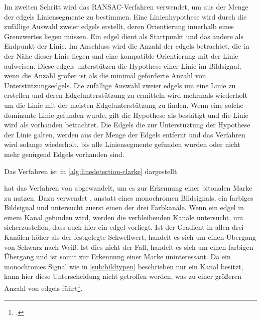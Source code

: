 Im zweiten Schritt wird das RANSAC-Verfahren verwendet, um aus der Menge der \glspl{edgel} Liniensegmente zu bestimmen.
 Eine Linienhypothese wird durch die zufällige Auswahl zweier \glspl{edgel} erstellt, deren Orientierung innerhalb
 eines Grenzwertes liegen müssen. Ein \gls{edgel} dient als Startpunkt und das andere als Endpunkt der Linie. Im
 Anschluss wird die Anzahl der \glspl{edgel} betrachtet, die in der Nähe dieser Linie liegen und eine kompatible
 Orientierung mit der Linie aufweisen. Diese \glspl{edgel} unterstützen die Hypothese einer Linie im Bildsignal, wenn
 die Anzahl größer ist als die minimal geforderte Anzahl von Unterstützungsedgels. Die zufällige Auswahl zweier
 \glspl{edgel} um eine Linie zu erstellen und deren Edgelunterstützung zu ermitteln wird mehrmals wiederholt um die
 Linie mit der meisten Edgelunterstützung zu finden. Wenn eine solche dominante Linie gefunden wurde, gilt die
 Hypothese als bestätigt und die Linie wird als vorhanden betrachtet. Die Edgels die zur Unterstüztung der Hypothese
 der Linie galten, werden aus der Menge der Edgels entfernt und das Verfahren wird solange wiederholt, bis alle
 Liniensegmente gefunden wurden oder nicht mehr genügend Edgels vorhanden sind.

Das Verfahren ist in \autoref{alg:linedetection-clarke} dargestellt.



\citeauthor{hirzer08} hat das Verfahren von \citeauthor{clarke96} abgewandelt, um es zur Erkennung einer bitonalen
 Marke zu nutzen. Dazu verwendet \citeauthor{hirzer08}, anstatt eines monochromen Bildsignals, ein farbiges Bildsignal
 und untersucht zuerst einen der drei Farbkanäle. Wenn ein \gls{edgel} in einem Kanal gefunden wird, werden die
 verbleibenden Kanäle untersucht, um sicherzustellen, dass auch hier ein \gls{edgel} vorliegt. Ist der Gradient in
 allen drei Kanälen höher als der festgelegte Schwellwert, handelt es sich um einen Übergang  von Schwarz nach Weiß.
 Ist dies nicht der Fall, handelt es sich um einen farbigen Übergang und ist somit zur Erkennung einer Marke
 uninteressant. Da ein monochromes Signal wie in \autoref{sub:bildtypen} beschrieben nur ein Kanal besitzt, kann hier
 diese Unterscheidung nicht getroffen werden, was zu einer größeren Anzahl von \glspl{edgel}
 führt\footcite[Vgl.][S.~6--7]{hirzer08}.



